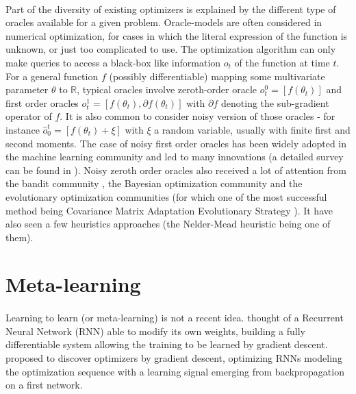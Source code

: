 {{	\paragraph{}Part of the diversity of existing optimizers is explained by the different type of oracles available for a given problem. Oracle-models are often considered in numerical optimization, for cases in which the literal expression of the function is unknown, or just too complicated to use. The optimization algorithm can only make queries to access a black-box like information $o_t$ of the function at time $t$. For a general function $f$ (possibly differentiable) mapping some multivariate parameter $\theta$ to $\mathbb{R}$, typical oracles involve zeroth-order oracle $o^0_t = \left[f(\theta_t)\right]$ and first order oracles $o^1_t = \left[f(\theta_t),\partial f(\theta_t)\right]$ with $\partial f$ denoting the sub-gradient operator of $f$. It is also common to consider noisy version of those oracles - for instance $\hat{o}_0^t = \left[f(\theta_t)+\xi\right]$ with $\xi$ a random variable, usually with finite first and second moments. The case of noisy first order oracles has been widely adopted in the machine learning community and led to many innovations (a detailed survey can be found in \cite{bottou2016optimization}). Noisy zeroth order oracles also received a lot of attention from the bandit community \cite{agarwal2011stochastic}, the Bayesian optimization community \cite{shahriari2016taking} and the evolutionary optimization communities (for which one of the most successful method being Covariance Matrix Adaptation Evolutionary Strategy \cite{hansen2016cma}). It have also seen a few heuristics approaches (the Nelder-Mead heuristic \cite{nelder1965simplex} being one of them). 
		}
		
		\section{Meta-learning}
		{
			\paragraph{} Learning to learn (or meta-learning) is not a recent idea. \cite{schmidhuber1987} thought of a Recurrent Neural Network (RNN) able to modify its own weights, building a fully differentiable system allowing the training to be learned by gradient descent. \cite{hochl2l} proposed to discover optimizers by gradient descent, optimizing RNNs modeling the optimization sequence with a learning signal emerging from backpropagation on a first network. 
	
}}
